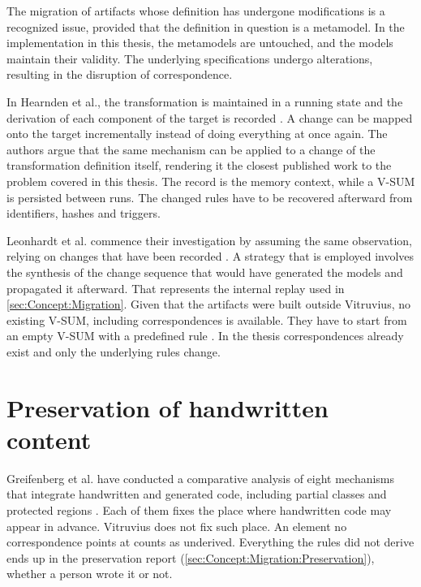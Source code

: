 The migration of artifacts whose definition has undergone modifications is a recognized issue, provided that the definition in question is a metamodel.
In the implementation in this thesis, the metamodels are untouched, and the models maintain their validity.
The underlying specifications undergo alterations, resulting in the disruption of correspondence.

In Hearnden et al., the transformation is maintained in a running state and the derivation of each component of the target is recorded \cite{hearnden2006incremental}.
A change can be mapped onto the target incrementally instead of doing everything at once again.
The authors argue that the same mechanism can be applied to a change of the transformation definition itself, rendering it the closest published work to the problem covered in this thesis.
The record is the memory context, while a V-SUM is persisted between runs.
The changed rules have to be recovered afterward from identifiers, hashes and triggers.

Leonhardt et al. commence their investigation by assuming the same observation, relying on changes that have been recorded \cite{leonhardt2015integration}.
A strategy that is employed involves the synthesis of the change sequence that would have generated the models and propagated it afterward.
That represents the internal replay used in \autoref{sec:Concept:Migration}.
Given that the artifacts were built outside Vitruvius, no existing V-SUM, including correspondences is available.
They have to start from an empty V-SUM with a predefined rule \cite{leonhardt2015integration}.
In the thesis correspondences already exist and only the underlying rules change.

\section{Preservation of handwritten content}
\label{sec:RelatedWork:PreservationOfHandwrittenContent}

Greifenberg et al. have conducted a comparative analysis of eight mechanisms that integrate handwritten and generated code, including partial classes and protected regions \cite{greifenberg2015integration}.
Each of them fixes the place where handwritten code may appear in advance.
Vitruvius does not fix such place.
An element no correspondence points at counts as underived.
Everything the rules did not derive ends up in the preservation report (\autoref{sec:Concept:Migration:Preservation}), whether a person wrote it or not.


